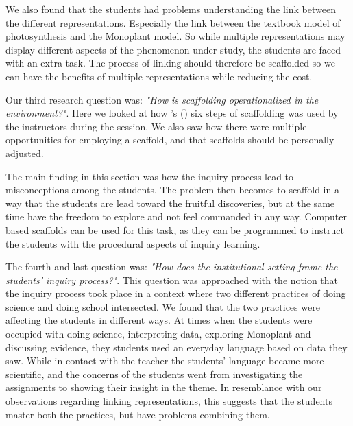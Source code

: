 We also found that the students had problems understanding the link between the different representations. Especially the link between the textbook model of photosynthesis and the Monoplant model. So while multiple representations may display different aspects of the phenomenon under study, the students are faced with an extra task. The process of linking should therefore be scaffolded so we can have the benefits of multiple representations while reducing the cost. 


Our third research question was: \emph{"How is scaffolding operationalized in the environment?"}. Here we looked at how \citeauthor{wood1976role}'s (\citeyear{wood1976role}) six steps of scaffolding was used by the instructors during the session. We also saw how there were multiple opportunities for employing a scaffold, and that scaffolds should be personally adjusted. 

The main finding in this section was how the inquiry process lead to misconceptions among the students. The problem then becomes to scaffold in a way that the students are lead toward the fruitful discoveries, but at the same time have the freedom to explore and not feel commanded in any way. Computer based scaffolds can be used for this task, as they can be programmed to instruct the students with the procedural aspects of inquiry learning. 

The fourth and last question was: \emph{"How does the institutional setting frame the students' inquiry process?"}. This question was approached with the notion that the inquiry process took place in a context where two different practices of doing science and doing school intersected. We found that the two practices were affecting the students in different ways. At times when the students were occupied with doing science, interpreting data, exploring Monoplant and discussing evidence, they students used an everyday language based on data they saw. While in contact with the teacher the students' language became more scientific, and the concerns of the students went from investigating the assignments to showing their insight in the theme. In resemblance with our observations regarding linking representations, this suggests that the students master both the practices, but have problems combining them.

